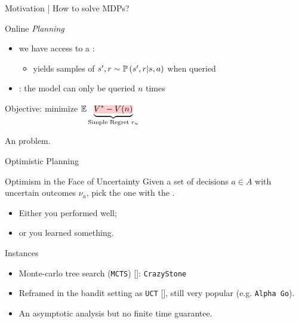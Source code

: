 \documentclass{beamer}
\begin{document}
\begin{frame}{Motivation | How to solve MDPs?}
\begin{exampleblock}{Online \emph{Planning}}
\begin{itemize}
    \item we have access to a : 
    \begin{itemize}
        \item[\incarrow] yields samples of $s', r \sim \mathbb{P}\left(s',r|s,a\right)$ when queried
    \end{itemize}
    \item {}: the model can only be queried $n$ times
\end{itemize}
\begin{center}
Objective: minimize $\expectedvalue \underbrace{\hler{V^* - V(n)}}_{\text{Simple Regret }r_n}$
\end{center}
\begin{flushright}
An  problem.
\end{flushright}
\end{exampleblock}
\end{frame}


\begin{frame}{Optimistic Planning}
    
    \begin{exampleblock}{Optimism in the Face of Uncertainty}
    Given a set of decisions $a\in A$ with uncertain outcomes $\nu_a$, pick the one with the .\pause
    
    \begin{itemize}
        \item Either you performed well;\pause
        \item or you learned something.\pause
    \end{itemize}
    \end{exampleblock}
    
    \begin{block}{Instances}
    \begin{itemize}
        \item Monte-carlo tree search (\texttt{MCTS}) [\cite{Coulom2006}]: \texttt{CrazyStone}
        \item Reframed in the bandit setting as \texttt{UCT} [\cite{Kocsis2006}], still very popular (e.g. \texttt{Alpha Go}).
        \item An asymptotic analysis but no finite time guarantee.
    \end{itemize}
    \end{block}
\end{frame}
\end{document}
